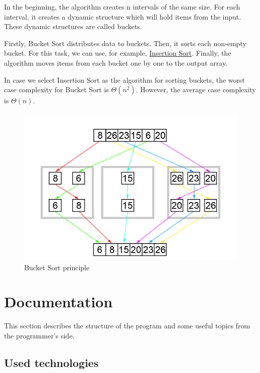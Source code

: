 \documentclass[
  field=inf,
  biblatex,
  language=english,
  glossaries,
  theorems=false,
  sourcecodes=false,
  index
]{kidiplom}
\begin{document}
In the beginning, the algorithm creates n intervals of the same size. For each interval, it creates a dynamic structure which will hold items from the input. These dynamic structures are called buckets.

Firstly, Bucket Sort distributes data to buckets. Then, it sorts each non-empty bucket. For this task, we can use, for example, \hyperref[sec:insertion]{Insertion Sort}. Finally, the algorithm moves items from each bucket one by one to the output array. 

In case we select Insertion Sort as the algorithm for sorting buckets, the worst case complexity for Bucket Sort is $\Theta(n^2)$. However, the average case complexity is $\Theta(n)$.

\begin{figure}[H]
\begin{center}
	
	\includegraphics[scale=0.3]{img/Bucketsort.png}
	\caption{Bucket Sort principle}\label{fig:bucketsort}
\end{center}
\end{figure}

\newpage
\section{Documentation}

This section describes the structure of the program and some useful topics from the programmer's side. 

\subsection{Used technologies}
\end{document}
